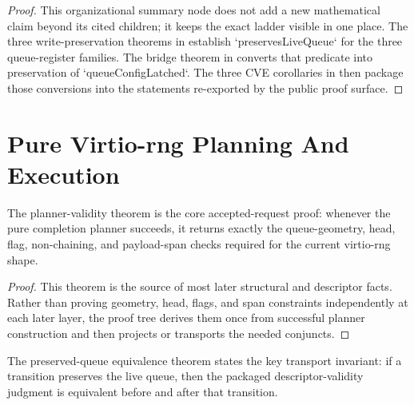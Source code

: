 \begin{proof}
\leanok
{}
This organizational summary node does not add a new mathematical claim beyond its cited children; it keeps the exact ladder visible in one place.
The three write-preservation theorems in  establish `preservesLiveQueue` for the three queue-register families.
The bridge theorem in  converts that predicate into preservation of `queueConfigLatched`.
The three CVE corollaries in  then package those conversions into the statements re-exported by the public proof surface.
\end{proof}

\section{Pure Virtio-rng Planning And Execution}

\begin{theorem}
\label{thm:planner-validity-kernel}
\leanok
The planner-validity theorem is the core accepted-request proof: whenever the pure completion planner succeeds, it returns exactly the queue-geometry, head, flag, non-chaining, and payload-span checks required for the current virtio-rng shape.
\end{theorem}

\begin{proof}
\leanok
{}
This theorem is the source of most later structural and descriptor facts.
Rather than proving geometry, head, flags, and span constraints independently at each later layer, the proof tree derives them once from successful planner construction and then projects or transports the needed conjuncts.
\end{proof}

\begin{theorem}
\label{thm:descriptor-equivalence-kernel}
\leanok
The preserved-queue equivalence theorem states the key transport invariant: if a transition preserves the live queue, then the packaged descriptor-validity judgment is equivalent before and after that transition.
\end{theorem}


